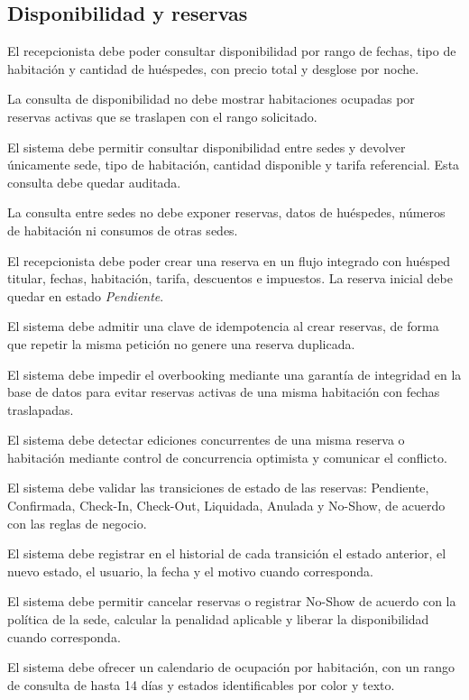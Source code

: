 \documentclass[12pt,a4paper]{article}
\newcommand{\RF}[2]{\item[\textbf{#1}] #2}
\begin{document}
\subsection{Disponibilidad y reservas}
\begin{description}[leftmargin=2.1cm,style=nextline]
  \RF{RF-18}{El recepcionista debe poder consultar disponibilidad por rango de fechas, tipo de habitación y cantidad de huéspedes, con precio total y desglose por noche.}
  \RF{RF-19}{La consulta de disponibilidad no debe mostrar habitaciones ocupadas por reservas activas que se traslapen con el rango solicitado.}
  \RF{RF-20}{El sistema debe permitir consultar disponibilidad entre sedes y devolver únicamente sede, tipo de habitación, cantidad disponible y tarifa referencial. Esta consulta debe quedar auditada.}
  \RF{RF-21}{La consulta entre sedes no debe exponer reservas, datos de huéspedes, números de habitación ni consumos de otras sedes.}
  \RF{RF-22}{El recepcionista debe poder crear una reserva en un flujo integrado con huésped titular, fechas, habitación, tarifa, descuentos e impuestos. La reserva inicial debe quedar en estado \textit{Pendiente}.}
  \RF{RF-23}{El sistema debe admitir una clave de idempotencia al crear reservas, de forma que repetir la misma petición no genere una reserva duplicada.}
  \RF{RF-24}{El sistema debe impedir el overbooking mediante una garantía de integridad en la base de datos para evitar reservas activas de una misma habitación con fechas traslapadas.}
  \RF{RF-25}{El sistema debe detectar ediciones concurrentes de una misma reserva o habitación mediante control de concurrencia optimista y comunicar el conflicto.}
  \RF{RF-26}{El sistema debe validar las transiciones de estado de las reservas: Pendiente, Confirmada, Check-In, Check-Out, Liquidada, Anulada y No-Show, de acuerdo con las reglas de negocio.}
  \RF{RF-27}{El sistema debe registrar en el historial de cada transición el estado anterior, el nuevo estado, el usuario, la fecha y el motivo cuando corresponda.}
  \RF{RF-28}{El sistema debe permitir cancelar reservas o registrar No-Show de acuerdo con la política de la sede, calcular la penalidad aplicable y liberar la disponibilidad cuando corresponda.}
  \RF{RF-29}{El sistema debe ofrecer un calendario de ocupación por habitación, con un rango de consulta de hasta 14 días y estados identificables por color y texto.}
\end{description}
\end{document}
